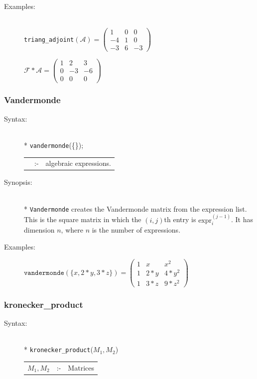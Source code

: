 {\begin{description}
\item[Examples:]\mbox{}\\
  \texttt{triang\_adjoint}\((\mathcal{A}) =
  \begin{pmatrix} 1 & 0 & 0 \\ -4 & 1 & 0 \\ -3 & 6 & -3 \end{pmatrix}\)

  \(\mathcal{F} * \mathcal{A} =
  \begin{pmatrix} 1 & 2 & 3 \\ 0 & -3 & -6 \\ 0 & 0 & 0 \end{pmatrix}\)
\end{description}

\subsubsection{Vandermonde}
\label{linalg:Vandermonde}
\hypertarget{operator:VANDERMONDE}{}

\begin{description}
\item[Syntax:]\mbox{}\\*
\texttt{vandermonde}(\{\exprlist{}\});
\lazyfootnote{}\\[2mm]
\begin{tabular}{l l l}
\exprlist{} &:-& algebraic expressions.
\end{tabular}

\item[Synopsis:]\mbox{}\\*
  \texttt{Vandermonde} creates the Vandermonde matrix from the expression list.
  This is the square matrix in which the $(i,j)$th entry is $\text{expr}_i^{(j-1)}$.
  It has dimension $n$, where $n$ is the number of expressions.

\item[Examples:]
\begin{flushleft}
\(
  \texttt{vandermonde}(\{x,2*y,3*z\}) =
  \begin{pmatrix} 1 & x & x^2 \\ 1 & 2*y & 4*y^2 \\ 1 & 3*z & 9*z^2 \end{pmatrix}
\)
\end{flushleft}
\end{description}

\subsubsection{kronecker\_product}
\hypertarget{operator:KRONECKER_PRODUCT}{}
\label{linalg:kronecker_product}
\begin{description}
\item[Syntax:]\mbox{}\\*
\texttt{kronecker\_product}($M_1,M_2$)\\[2mm]
\begin{tabular}{l l l}
$M_1,M_2$ &:-& Matrices
\end{tabular}


\end{description}}
